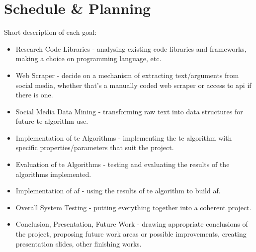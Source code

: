 \section{Schedule \& Planning}
    
    
    Short description of each goal:
    \begin{itemize}
        \item Research Code Libraries - analysing existing code libraries and frameworks, making a choice on programming language, etc.
        \item Web Scraper - decide on a mechanism of extracting text/arguments from social media, whether that's a manually coded web scraper or access to \gls{api} if there is one.
        \item Social Media Data Mining - transforming raw text into data structures for future \gls{te} algorithm use.
        \item Implementation of \gls{te} Algorithms - implementing the \gls{te} algorithm with specific properties/parameters that suit the project.
        \item Evaluation of \gls{te} Algorithms - testing and evaluating the results of the algorithms implemented.
        \item Implementation of \gls{af} - using the results of \gls{te} algorithm to build \gls{af}.
        \item Overall System Testing - putting everything together into a coherent project.
        \item Conclusion, Presentation, Future Work - drawing appropriate conclusions of the project, proposing future work areas or possible improvements, creating presentation slides, other finishing works.
    \end{itemize}